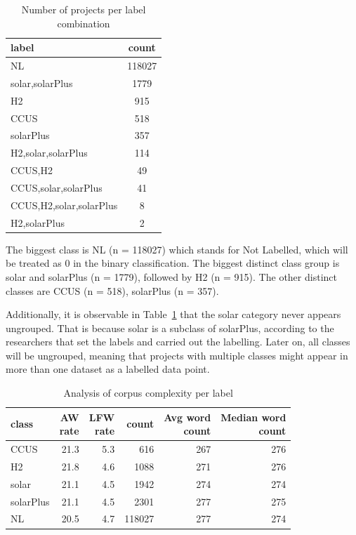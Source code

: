 \documentclass[letterpaper]{article} %
\begin{document}
\begin{table}
  \centering
  \begin{tabular}{lc}
      \hline
        label & count \\
        \hline
        NL                    & 118027 \\
        solar,solarPlus       & 1779   \\
        H2                    & 915    \\
        CCUS                  & 518    \\
        solarPlus             & 357    \\
        H2,solar,solarPlus    & 114    \\
        CCUS,H2               & 49     \\
        CCUS,solar,solarPlus  & 41     \\
        CCUS,H2,solar,solarPlus & 8    \\
        H2,solarPlus          & 2      \\\hline
  \end{tabular}
  \caption{Number of projects per label combination}\label{table:labels}
\end{table}

The biggest class is NL (n = 118027) which stands for Not Labelled, which will be treated as 0 in the binary classification. The biggest distinct class group is solar and solarPlus (n = 1779), followed by H2 (n = 915). The other distinct classes are CCUS (n = 518),
solarPlus (n = 357).

Additionally, it is observable in Table~\ref{table:labels} that the solar category never appears ungrouped. That is because solar is a subclass of solarPlus, according to the researchers that set the labels and carried out the labelling.
Later on, all classes will be ungrouped, meaning that projects with multiple classes might appear in more than one dataset as a labelled data point.

\begin{table}
  \centering
    \begin{tabular}{lrrrrr}
      \hline
      class & \thead{AW \\ rate} & \thead{LFW \\ rate} & count & \thead{Avg word \\ count} & \thead{Median word \\ count} \\
      \hline
      CCUS & 21.3 & 5.3 & 616 & 267 & 276 \\
      H2 & 21.8 & 4.6 & 1088 & 271 & 276 \\
      solar & 21.1 & 4.5 & 1942 & 274 & 274 \\
      solarPlus & 21.1 & 4.5 & 2301 & 277 & 275 \\
      NL & 20.5 & 4.7 & 118027 & 277 & 274 \\
      \hline
    \end{tabular}
    \caption{Analysis of corpus complexity per label}
    \label{table:classDesc}
\end{table}
\end{document}
